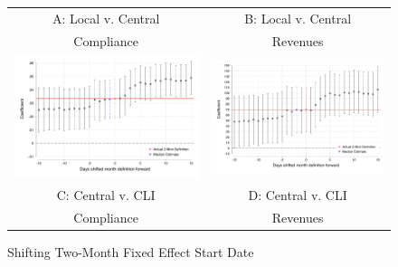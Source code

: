 \documentclass[12pt,english]{article}
\begin{document}

\begin{figure}[H]
\centering{}\caption{Shifting Two-Month Fixed Effect Start Date \label{fig:shift_start_2moFE}}
\begin{tabular}{cc}
A: Local v. Central & B: Local v. Central\\
Compliance & Revenues\\
\includegraphics[scale=0.45]{Output/shiftFE_compl_CvL.pdf}&\includegraphics[scale=0.45]{Output/shiftFE_rev_CvL.pdf}\\
C: Central v. CLI & D: Central v. CLI\\
Compliance & Revenues\\

\end{tabular}
\end{figure}
\end{document}

